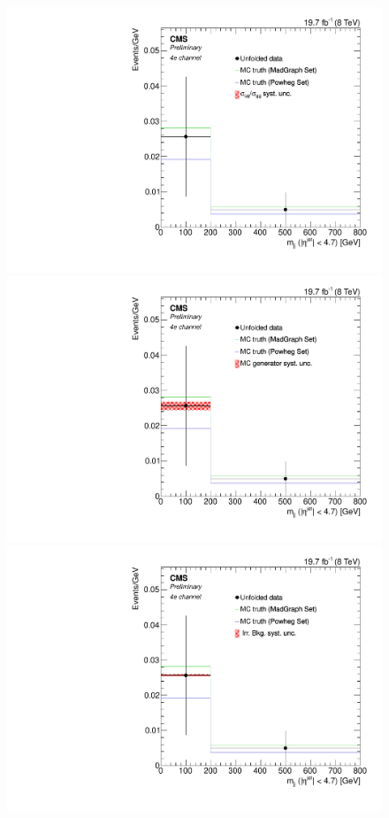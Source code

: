 \begin{figure}[hbtp]
  \begin{center}
    \includegraphics[width=0.8\cmsFigWidth]{Figures/Unfolding/Systematics/ZZTo4e_Mjj_qqgg_Mad_fr}     
    \includegraphics[width=0.8\cmsFigWidth]{Figures/Unfolding/Systematics/ZZTo4e_Mjj_MCgen_Mad_fr}     
    \includegraphics[width=0.8\cmsFigWidth]{Figures/Unfolding/Systematics/ZZTo4e_Mjj_IrrBkg_Mad_fr}

\end{center}
\end{figure}
